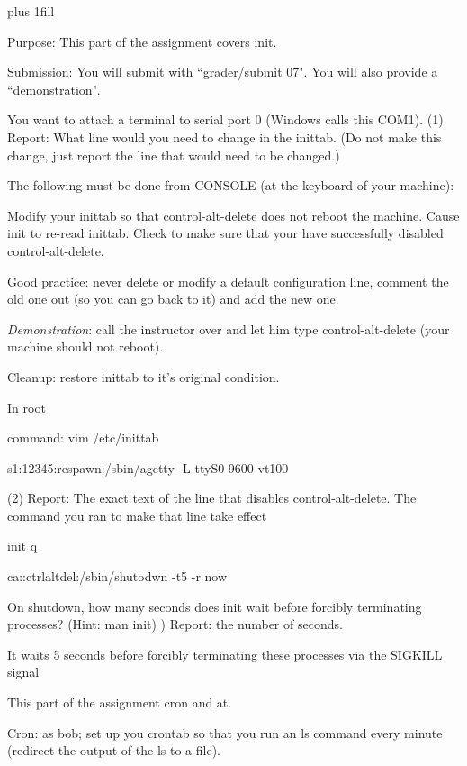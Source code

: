 
\rightskip=0pt plus 1fill

\parindent 0pt

Purpose: This part of the assignment covers init.

Submission: You will submit with ``\tilde grader/submit 07".
You will also provide a ``demonstration".

You want to attach a terminal to serial port 0 (Windows calls this COM1).
(1) Report: What line would you need to change in the inittab.
(Do not make this change, just report the line that would need
to be changed.)

The following must be done from CONSOLE (at the keyboard of your machine):

Modify your {\ltt{}inittab} so that control-alt-delete does not
reboot the machine.
Cause {\ltt{}init} to re-read {\ltt{}inittab}.
Check to make sure that your have successfully disabled control-alt-delete.

Good practice: never delete or modify a default configuration line, 
comment the old one out (so you can go back to it) and add the new one.

{\it Demonstration}: 
call the instructor over and let him type control-alt-delete
(your machine should not reboot).

Cleanup: restore {\ltt{}inittab} to it's original condition. 


In root

command:
vim /etc/inittab

s1:12345:respawn:/sbin/agetty -L ttyS0 9600 vt100


(2) Report: The exact text of the line that disables control-alt-delete.
The command you ran to make that line take effect

init q


ca::ctrlaltdel:/sbin/shutodwn -t5 -r now


On shutdown, how many seconds does {\ltt{}init} wait before 
forcibly terminating processes? (Hint: {\ltt{}man init})
) Report: the number of seconds.

It waits 5 seconds before forcibly terminating these processes via the SIGKILL
signal

This part of the assignment cron and at.

Cron: as bob; set up you crontab so that you run an {\ltt{}ls} command
every minute (redirect the output of the {\ltt{}ls} to a file). 


